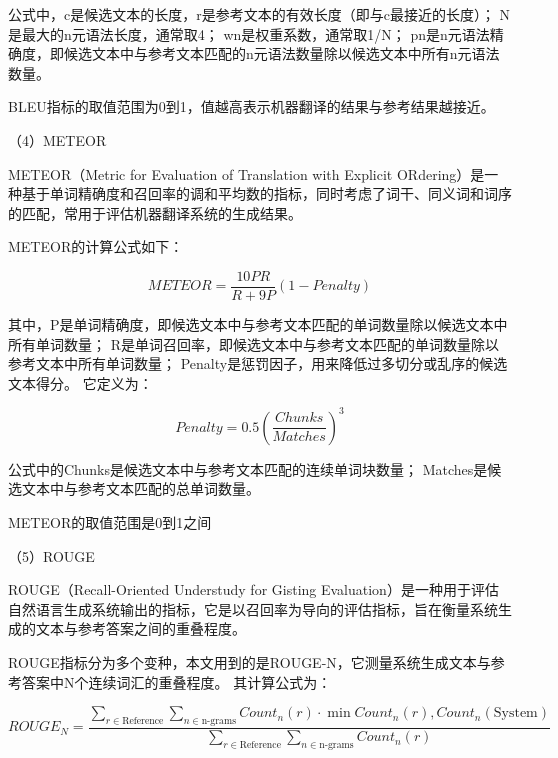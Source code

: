 公式中，c是候选文本的长度，r是参考文本的有效长度（即与c最接近的长度）；
N是最大的n元语法长度，通常取4；
wn是权重系数，通常取1/N；
pn是n元语法精确度，即候选文本中与参考文本匹配的n元语法数量除以候选文本中所有n元语法数量。

BLEU指标的取值范围为0到1，值越高表示机器翻译的结果与参考结果越接近。

（4）METEOR

METEOR（Metric for Evaluation of Translation with Explicit ORdering）是一种基于单词精确度和召回率的调和平均数的指标，同时考虑了词干、同义词和词序的匹配，常用于评估机器翻译系统的生成结果。


METEOR的计算公式如下：

$$METEOR = \frac{10 P R}{R + 9 P} (1 - Penalty)$$

其中，P是单词精确度，即候选文本中与参考文本匹配的单词数量除以候选文本中所有单词数量；
R是单词召回率，即候选文本中与参考文本匹配的单词数量除以参考文本中所有单词数量；
Penalty是惩罚因子，用来降低过多切分或乱序的候选文本得分。
它定义为：

$$Penalty = 0.5 (\frac{Chunks}{Matches})^3$$

公式中的Chunks是候选文本中与参考文本匹配的连续单词块数量；
Matches是候选文本中与参考文本匹配的总单词数量。

METEOR的取值范围是0到1之间


（5）ROUGE

ROUGE（Recall-Oriented Understudy for Gisting Evaluation）是一种用于评估自然语言生成系统输出的指标，它是以召回率为导向的评估指标，旨在衡量系统生成的文本与参考答案之间的重叠程度。

ROUGE指标分为多个变种，本文用到的是ROUGE-N，它测量系统生成文本与参考答案中N个连续词汇的重叠程度。
其计算公式为：

$$ROUGE_{N} = \frac{\sum\limits_{r\in\text{Reference}}\sum\limits_{n\in\text{n-grams}}Count_n(r)\cdot \min{Count_n(r), Count_n(\text{System})}}{\sum\limits_{r\in\text{Reference}}\sum\limits_{n\in\text{n-grams}}Count_n(r)}$$

